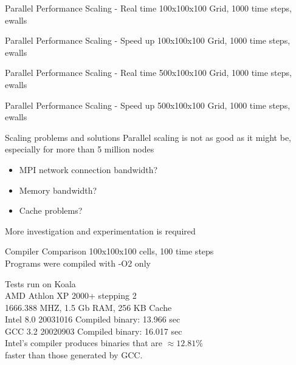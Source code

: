 \documentclass[pdf, nototal, slideBW]{prosper}
\newcommand{\insgraphic}[2]{
  \begin{center}
    \scalebox{#1}{
      \texttt{[image: \#2]}
    }
  \end{center}
}
\begin{document}
\begin{slide}{Parallel Performance Scaling - Real time}
  100x100x100 Grid, 1000 time steps, ewalls

  \insgraphic{0.5}{realtime.eps}
\end{slide}

\begin{slide}{Parallel Performance Scaling - Speed up}
  100x100x100 Grid, 1000 time steps, ewalls

  \insgraphic{0.5}{speedup.eps}
\end{slide}

\begin{slide}{Parallel Performance Scaling - Real time}
  500x100x100 Grid, 1000 time steps, ewalls

  \insgraphic{0.5}{realtime-5m.eps}
\end{slide}

\begin{slide}{Parallel Performance Scaling - Speed up}
  500x100x100 Grid, 1000 time steps, ewalls

  \insgraphic{0.5}{speedup-5m.eps}
\end{slide}

\begin{slide}{Scaling problems and solutions}
   Parallel scaling is not as good as it might be, especially for more
   than 5 million nodes
  \begin{itemize}
  \item MPI network connection bandwidth?
  \item Memory bandwidth?
  \item Cache problems?
  \end{itemize}

  More investigation and experimentation is required
\end{slide}

\begin{slide}{Compiler Comparison}
  100x100x100 cells, 100 time steps \\
  Programs were compiled with -O2 only

  \vspace{0.5cm}
  Tests run on Koala\\
  AMD Athlon XP 2000+ stepping 2\\
  1666.388 MHZ,   1.5 Gb RAM, 256 KB Cache\\

  \vspace{0.5cm}
  Intel 8.0 20031016 Compiled binary: 13.966 sec\\
  GCC 3.2 20020903 Compiled binary: 16.017 sec\\

  \vspace{0.5cm}
  Intel's compiler produces binaries that are $\approx 12.81\%$ \\
  faster than those generated by GCC.  
\end{slide}
\end{document}
